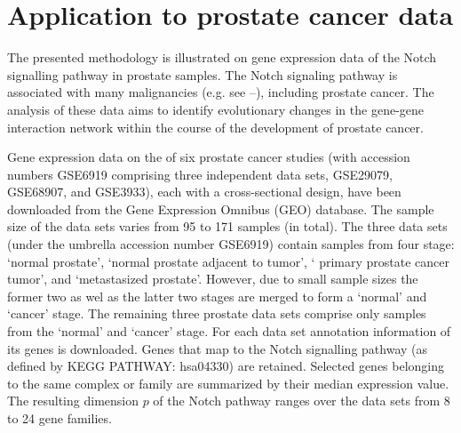 \documentclass[10pt]{article}
\newcommand{\red}[1]{{\textcolor {red} {#1}}}
\begin{document}





\section{Application to prostate cancer data}\label{application}
The presented methodology is illustrated on gene expression data of the Notch signalling pathway in prostate samples. The
Notch signaling pathway is associated with many malignancies (e.g. see \citet{leong2006recent}--\citet{espinoza2013notch}), including prostate cancer. The analysis of these data aims to identify evolutionary changes in the gene-gene interaction network within the course of the development of prostate cancer. 




Gene expression data on the of six prostate cancer studies (with accession numbers GSE6919 comprising three independent data sets,  GSE29079, GSE68907, and GSE3933), each with a cross-sectional design, have been downloaded from the Gene Expression Omnibus (GEO) database. The sample size of the data sets varies from 95 to 171 samples (in total). The three data sets (under the umbrella accession number GSE6919) contain samples from four stage: `normal prostate', `normal prostate adjacent to tumor', ` primary prostate cancer tumor', and `metastasized prostate'. However, due to small sample sizes the former two as wel as the latter two stages are merged to form a `normal'  and `cancer' stage. The remaining three prostate data sets comprise only samples from the `normal'  and `cancer' stage. For each data set annotation information of its genes is downloaded. Genes that map to the Notch signalling pathway (as defined by KEGG 	PATHWAY: hsa04330) are retained. Selected genes belonging to the same complex or family are summarized by their median expression value. The resulting dimension $p$ of the Notch pathway ranges over the data sets from 8 to 24 gene families.
\end{document}
